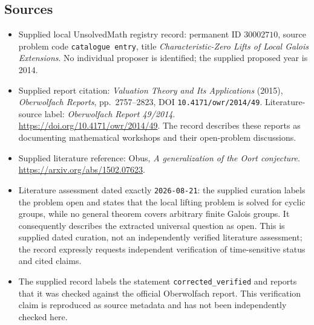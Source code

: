 \documentclass[11pt]{article}
\begin{document}
\subsection{Sources}
\begin{itemize}
\item Supplied local UnsolvedMath registry record: permanent ID \(30002710\), source problem code \texttt{catalogue entry}, title \emph{Characteristic-Zero Lifts of Local Galois Extensions}. No individual proposer is identified; the supplied proposed year is 2014.
\item Supplied report citation: \emph{Valuation Theory and Its Applications} (2015), \emph{Oberwolfach Reports}, pp.\ 2757--2823, DOI \texttt{10.4171/owr/2014/49}. Literature-source label: \emph{Oberwolfach Report 49/2014}. \url{https://doi.org/10.4171/owr/2014/49}. The record describes these reports as documenting mathematical workshops and their open-problem discussions.
\item Supplied literature reference: Obus, \emph{A generalization of the Oort conjecture}. \url{https://arxiv.org/abs/1502.07623}.
\item Literature assessment dated exactly \texttt{2026-08-21}: the supplied curation labels the problem open and states that the local lifting problem is solved for cyclic groups, while no general theorem covers arbitrary finite Galois groups. It consequently describes the extracted universal question as open. This is supplied dated curation, not an independently verified literature assessment; the record expressly requests independent verification of time-sensitive status and cited claims.
\item The supplied record labels the statement \texttt{corrected\_verified} and reports that it was checked against the official Oberwolfach report. This verification claim is reproduced as source metadata and has not been independently checked here.
\end{itemize}
\end{document}
